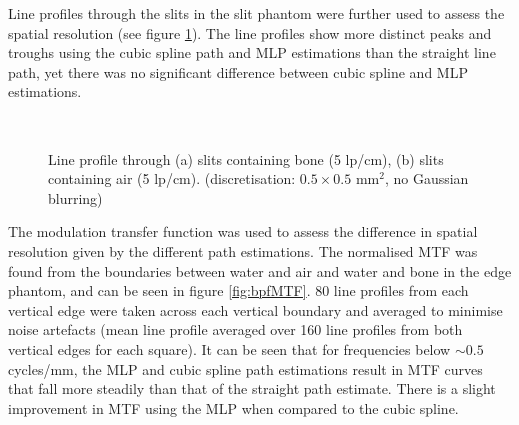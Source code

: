\documentclass[11pt,a4paper]{article}
\begin{document}
Line profiles through the slits in the slit phantom were further used to assess the spatial resolution (see figure \ref{fig:bpfLineProfile}). The line profiles show more distinct peaks and troughs using the cubic spline path and MLP estimations than the straight line path, yet there was no significant difference between cubic spline and MLP estimations.

\begin{figure}[!htb]
  \hspace*{\fill}%
  \hfill%
  \hspace*{\fill}\\
  \caption{Line profile through (a) slits containing bone (5 lp/cm), (b) slits containing air (5 lp/cm). (discretisation: $0.5 \times 0.5$ mm$^2$, no Gaussian blurring)}%
  \label{fig:bpfLineProfile}
\end{figure}

The modulation transfer function was used to assess the difference in spatial resolution given by the different path estimations. The normalised MTF was found from the boundaries between water and air and water and bone in the edge phantom, and can be seen in figure \ref{fig:bpfMTF}. 80 line profiles from each vertical edge were taken across each vertical boundary and averaged to minimise noise artefacts (mean line profile averaged over 160 line profiles from both vertical edges for each square). It can be seen that for frequencies below $\sim 0.5$ cycles/mm, the MLP and cubic spline path estimations result in MTF curves that fall more steadily than that of the straight path estimate. There is a slight improvement in MTF using the MLP when compared to the cubic spline. 
\end{document}
